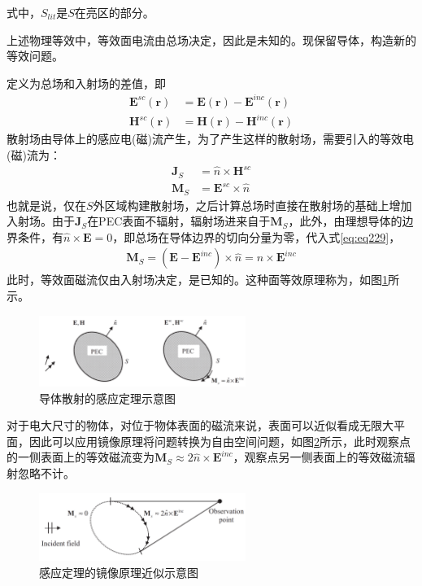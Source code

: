 \documentclass{article}
\numberwithin{equation}{section}
\renewcommand{\vec}[1]{\boldsymbol{#1}}
\begin{document}
式中，$S_{lit}$是$S$在亮区的部分。\par
上述物理等效中，等效面电流由总场决定，因此是未知的。现保留导体，构造新的等效问题。
\par
定义\textbf{\color{blue}{散射场}}为总场和入射场的差值，即
\begin{align}
    \label{eq:eq226}
    \mathbf{E}^{sc}(\vec{r})&=\mathbf{E}(\vec{r})-\mathbf{E}^{inc}(\vec{r}) \\
    \label{eq:eq227}
    \mathbf{H}^{sc}(\vec{r})&=\mathbf{H}(\vec{r})-\mathbf{H}^{inc}(\vec{r})
\end{align}
散射场由导体上的感应电(磁)流产生，为了产生这样的散射场，需要引入的等效电(磁)流为：
\begin{align}
    \label{eq:eq228}
    \mathbf{J}_S&=\hat{n}\times\mathbf{H}^{sc} \\
    \label{eq:eq229}
    \mathbf{M}_S&=\mathbf{E}^{sc}\times\hat{n}
\end{align}
也就是说，仅在$S$外区域构建散射场，之后计算总场时直接在散射场的基础上增加入射场。由于$\mathbf{J}_S$在PEC表面不辐射，辐射场进来自于$\mathbf{M}_S$，此外，由理想导体的边界条件，有$\hat{n}\times\mathbf{E}=0$，即总场在导体边界的切向分量为零，代入式\ref{eq:eq229}，
\begin{align}
    \label{eq:eq230}
    \mathbf{M}_S=(\mathbf{E}-\mathbf{E}^{inc})\times\hat{n}=\hat{n}\times\mathbf{E}^{inc}
\end{align}
此时，等效面磁流仅由入射场决定，是已知的。这种面等效原理称为\textbf{\color{blue}{感应定理}}，如图\ref{fig:fig19}所示。
\begin{figure}[ht]
    \centering
    \includegraphics[width=0.6\textwidth]{导体散射的感应定理示意图.PNG}
    \caption{导体散射的感应定理示意图}
    \label{fig:fig19}
\end{figure}
对于电大尺寸的物体，对位于物体表面的磁流来说，表面可以近似看成无限大平面，因此可以应用镜像原理将问题转换为自由空间问题，如图\ref{fig:fig20}所示，此时观察点的一侧表面上的等效磁流变为$\mathbf{M}_S\approx2\hat{n}\times\mathbf{E}^{inc}$，观察点另一侧表面上的等效磁流辐射忽略不计。
\begin{figure}[ht]
    \centering
    \includegraphics[width=0.6\textwidth]{感应定理的镜像原理近似示意图.PNG}
    \caption{感应定理的镜像原理近似示意图}
    \label{fig:fig20}
\end{figure}
\end{document}

